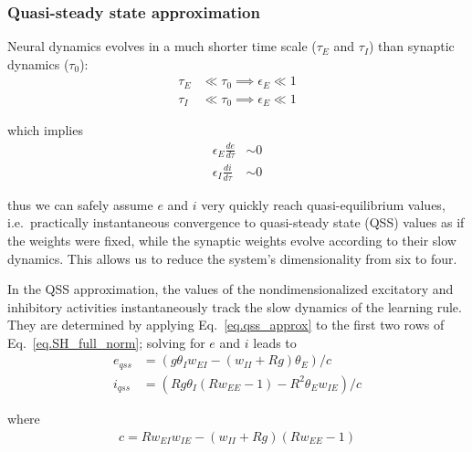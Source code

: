 \documentclass[
twocolumn,
]{article}
\newcommand{\EE}{\mathit{EE}}
\newcommand{\EI}{\mathit{EI}}
\newcommand{\IE}{\mathit{IE}}
\newcommand{\II}{\mathit{II}}
\newcommand{\qss}{\mathit{qss}}
\begin{document}
\subsubsection{Quasi-steady state approximation}

Neural dynamics evolves in a much shorter time scale ($\tau_E$ and $\tau_I$) than synaptic dynamics ($\tau_0$):
\begin{displaymath}
\begin{aligned}
\tau_E & \ll \tau_0 \implies \epsilon_E \ll 1 \\
\tau_I & \ll \tau_0 \implies \epsilon_E \ll 1
\end{aligned}
\end{displaymath}

\noindent which implies
\begin{equation}
\begin{aligned}
\epsilon_E\frac{de}{d\tau} & \sim 0 \\
\epsilon_I\frac{di}{d\tau} & \sim 0
\end{aligned}
\label{eq.qss_approx}
\end{equation}

\noindent thus we can safely assume $e$ and $i$ very quickly reach quasi-equilibrium values, i.e.\ practically instantaneous convergence to quasi-steady state (QSS) values as if the weights were fixed, while the synaptic weights evolve according to their slow dynamics. This allows us to reduce the system's dimensionality from six to four.

In the QSS approximation, the values of the nondimensionalized excitatory and inhibitory activities instantaneously track the slow dynamics of the learning rule. They are determined by applying Eq.\ \ref{eq.qss_approx} to the first two rows of Eq.\ \ref{eq.SH_full_norm}; solving for $e$ and $i$ leads to
\begin{equation}
\begin{aligned}
e_{\qss} & = (g \theta_I w_{\EI} - (w_{\II} + Rg) \theta_E)/c \\
i_{\qss} & = (R g \theta_I (R w_{\EE} - 1) - R^2 \theta_E w_{\IE})/c
\end{aligned}
\label{eq.SH_upstate_qss}
\end{equation}

\noindent where
\begin{displaymath}
\begin{aligned}
c = R w_{\EI} w_{\IE} - (w_{\II} + Rg)(R w_{\EE} - 1)
\end{aligned}
\end{displaymath}
\end{document}
